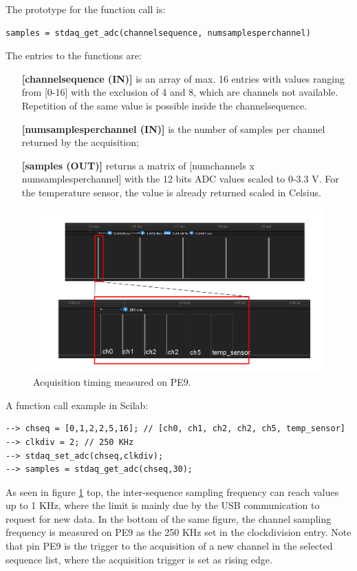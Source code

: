 \documentclass[letterpaper,10pt,english]{hitec}
\begin{document}
The prototype for the function call is:
\begin{verbatim}
samples = stdaq_get_adc(channelsequence, numsamplesperchannel)
\end{verbatim}
The entries to the functions are:
\begin{itemize}
\item [\textbf{[channelsequence (IN)]}] is an array of max. 16 entries with values ranging from [0-16] with the exclusion of 4 and 8, which are channels not available. Repetition of the same value is possible inside the channelsequence.
\item [\textbf{[numsamplesperchannel (IN)]}] is the number of samples per channel returned by the acquisition;
\item [\textbf{[samples (OUT)]}] returns a matrix of [numchannels x numsamplesperchannel] with the 12 bits ADC values scaled to 0-3.3 V. For the temperature sensor, the value is already returned scaled in Celsius.
\end{itemize}
\begin{figure}[ht!]
\includegraphics[scale=0.4]{../img/adc_timing_a.png}
\caption{Acquisition timing measured on PE9.}
\label{fig:adc_timing_a}
\end{figure}
A function call example in Scilab:
\begin{verbatim}
--> chseq = [0,1,2,2,5,16]; // [ch0, ch1, ch2, ch2, ch5, temp_sensor]
--> clkdiv = 2; // 250 KHz
--> stdaq_set_adc(chseq,clkdiv);
--> samples = stdaq_get_adc(chseq,30);
\end{verbatim}

As seen in figure \ref{fig:adc_timing_a} top, the inter-sequence sampling frequency can reach values up to 1 KHz, where the limit is mainly due by the USB communication to request for new data.
In the bottom of the same figure, the channel sampling frequency is measured on PE9 as the 250 KHz set in the clockdivision entry. Note that pin PE9 is the trigger to the acquisition of a new channel in the selected sequence list, where the acquisition trigger is set as rising edge.
\end{document}
